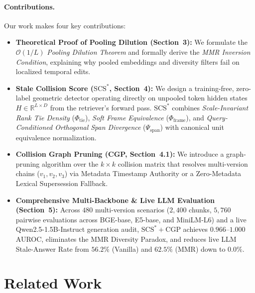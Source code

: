 \documentclass[11pt,a4paper]{article}
\theoremstyle{definition}
\newcommand{\SCS}{\mathrm{SCS}^*}
\begin{document}
\paragraph{Contributions.} Our work makes four key contributions:
\begin{itemize}
    \item \textbf{Theoretical Proof of Pooling Dilution (Section~3):} We formulate the $\mathcal{O}(1/L)$ \emph{Pooling Dilution Theorem} and formally derive the \emph{MMR Inversion Condition}, explaining why pooled embeddings and diversity filters fail on localized temporal edits.
    \item \textbf{Stale Collision Score ($\SCS$, Section~4):} We design a training-free, zero-label geometric detector operating directly on unpooled token hidden states $H \in \mathbb{R}^{L \times D}$ from the retriever's forward pass. $\SCS$ combines \emph{Scale-Invariant Rank Tie Density} ($\Phi_{\mathrm{tie}}$), \emph{Soft Frame Equivalence} ($\Phi_{\mathrm{frame}}$), and \emph{Query-Conditioned Orthogonal Span Divergence} ($\Psi_{\mathrm{span}}$) with canonical unit equivalence normalization.
    \item \textbf{Collision Graph Pruning (CGP, Section~4.1):} We introduce a graph-pruning algorithm over the $k \times k$ collision matrix that resolves multi-version chains ($v_1, v_2, v_3$) via Metadata Timestamp Authority or a Zero-Metadata Lexical Supersession Fallback.
    \item \textbf{Comprehensive Multi-Backbone \& Live LLM Evaluation (Section~5):} Across $480$ multi-version scenarios ($2{,}400$ chunks, $5{,}760$ pairwise evaluations across BGE-base, E5-base, and MiniLM-L6) and a live Qwen2.5-1.5B-Instruct generation audit, $\SCS+\mathrm{CGP}$ achieves $0.966$--$1.000$ AUROC, eliminates the MMR Diversity Paradox, and reduces live LLM Stale-Answer Rate from $56.2\%$ (Vanilla) and $62.5\%$ (MMR) down to $0.0\%$.
\end{itemize}

\section{Related Work}
\end{document}
